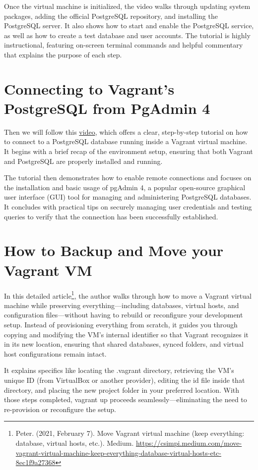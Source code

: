 \documentclass{article}
\begin{document}
Once the virtual machine is initialized, the video walks through updating system packages, adding the official PostgreSQL repository, and installing the PostgreSQL server. It also shows how to start and enable the PostgreSQL service, as well as how to create a test database and user accounts. The tutorial is highly instructional, featuring on-screen terminal commands and helpful commentary that explains the purpose of each step.

\section{Connecting to Vagrant's PostgreSQL from PgAdmin 4} \label{sec:connecting}
Then we will follow this \href{https://youtu.be/_9rVc18NuOI?si=cQ2p9BFS2gfkHZtJ}{video}, which offers a clear, step-by-step tutorial on how to connect to a PostgreSQL database running inside a Vagrant virtual machine. It begins with a brief recap of the environment setup, ensuring that both Vagrant and PostgreSQL are properly installed and running.

The tutorial then demonstrates how to enable remote connections and focuses on the installation and basic usage of pgAdmin 4, a popular open-source graphical user interface (GUI) tool for managing and administering PostgreSQL databases. It concludes with practical tips on securely managing user credentials and testing queries to verify that the connection has been successfully established.

\section{How to Backup and Move your Vagrant VM}
In this detailed article\footnote{Peter. (2021, February 7). Move Vagrant virtual machine (keep everything: database, virtual hosts, etc.). Medium. \url{https://csimpi.medium.com/move-vagrant-virtual-machine-keep-everything-database-virtual-hosts-etc-8ec1f9a27368}}, the author walks through how to move a Vagrant virtual machine while preserving everything—including databases, virtual hosts, and configuration files—without having to rebuild or reconfigure your development setup. Instead of provisioning everything from scratch, it guides you through copying and modifying the VM's internal identifier so that Vagrant recognizes it in its new location, ensuring that shared databases, synced folders, and virtual host configurations remain intact.

It explains specifics like locating the .vagrant directory, retrieving the VM's unique ID (from VirtualBox or another provider), editing the id file inside that directory, and placing the new project folder in your preferred location. With those steps completed, vagrant up proceeds seamlessly—eliminating the need to re-provision or reconfigure the setup.
\end{document}
